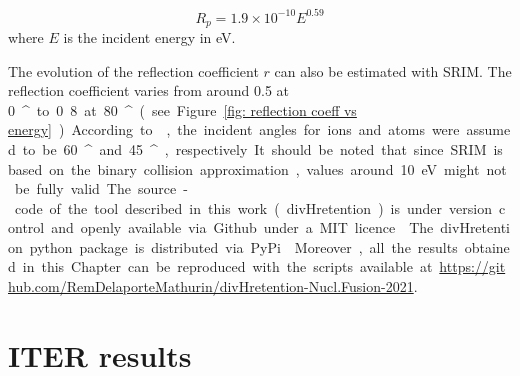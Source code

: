 \begin{equation}
    R_p = 1.9\times 10^{-10} E ^{0.59}
    \label{eq: implantation range}
\end{equation}
where $E$ is the incident energy in \si{eV}.

The evolution of the reflection coefficient $r$ can also be estimated with SRIM.
The reflection coefficient varies from around 0.5 at \SI{0}{^\circ} to 0.8 at \SI{80}{^\circ} (see Figure \ref{fig: reflection coeff vs energy}).
According to , the incident angles for ions and atoms were assumed to be \SI{60}{^\circ} and \SI{45}{^\circ}, respectively.
It should be noted that since SRIM is based on the binary collision approximation, values around \SI{10}{eV} might not be fully valid.

The source-code of the tool described in this work (divHretention) is under version control and openly available via Github under a MIT licence \cite{delaporte-mathurin_irfmdivhretention_2021}.
The divHretention python package is distributed via PyPi \cite{delaporte-mathurin_divhretention_nodate}.
Moreover, all the results obtained in this Chapter can be reproduced with the scripts available at \href{https://github.com/RemDelaporteMathurin/divHretention-Nucl.Fusion-2021}{https://github.com/RemDelaporteMathurin/divHretention-Nucl.Fusion-2021}.

\section{ITER results}




